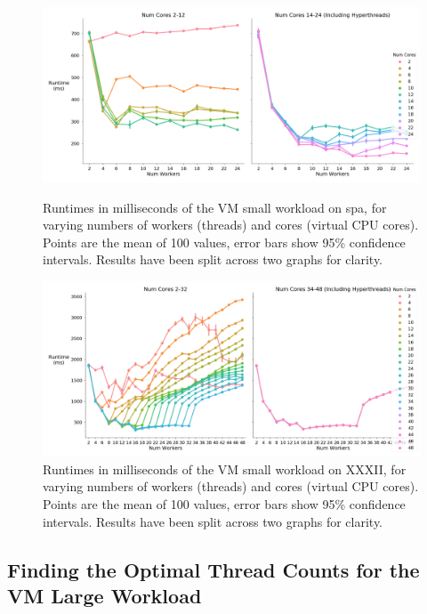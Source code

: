 \begin{figure}[H]
    \vspace*{-2.5cm}
    \centerline{\includegraphics[width=1.5\textwidth]{graphics/optimal_threads/spa/optimal_threads_vm_small.png}}
    \caption{Runtimes in milliseconds of the VM small workload on spa, for varying numbers of workers (threads) and cores (virtual CPU cores). Points are the mean of 100 values, error bars show 95\% confidence intervals. Results have been split across two graphs for clarity.}
    \label{fig:opt_spa_vm_small}
    
    \centerline{\includegraphics[width=1.5\textwidth]{graphics/optimal_threads/XXXII/optimal_threads_vm_small.png}}
    \caption{Runtimes in milliseconds of the VM small workload on XXXII, for varying numbers of workers (threads) and cores (virtual CPU cores). Points are the mean of 100 values, error bars show 95\% confidence intervals. Results have been split across two graphs for clarity.}
    \label{fig:opt_xxxii_vm_small}
\end{figure}



\subsection{Finding the Optimal Thread Counts for the VM Large Workload}
\label{section:results:finding_the_optimal_thread_couonts_for_the_vm_large_workload}

